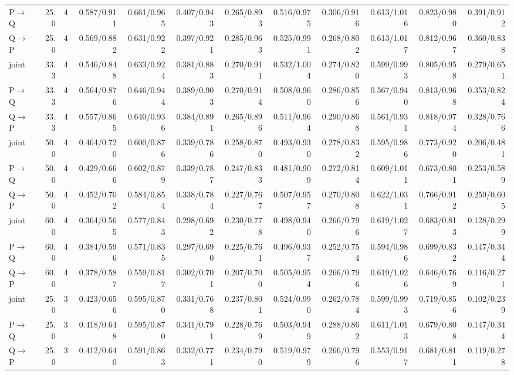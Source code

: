 \documentclass{article}
\begin{document}
\begin{longtable}{lrrrrrrrrrrr}
P$\to$Q & 25.0 & 4 & 0.587/0.911 & 0.661/0.965 & 0.407/0.943 & 0.265/0.893 & 0.516/0.975 & 0.306/0.916 & 0.613/1.016 & 0.823/0.980 & 0.391/0.912 \\
Q$\to$P & 25.0 & 4 & 0.569/0.882 & 0.631/0.922 & 0.397/0.921 & 0.285/0.963 & 0.525/0.991 & 0.268/0.802 & 0.613/1.017 & 0.812/0.967 & 0.360/0.838 \\
joint & 33.3 & 4 & 0.546/0.848 & 0.633/0.924 & 0.381/0.883 & 0.270/0.911 & 0.532/1.004 & 0.274/0.820 & 0.599/0.993 & 0.805/0.958 & 0.279/0.651 \\
P$\to$Q & 33.3 & 4 & 0.564/0.876 & 0.646/0.944 & 0.389/0.903 & 0.270/0.914 & 0.508/0.960 & 0.286/0.856 & 0.567/0.940 & 0.813/0.968 & 0.353/0.824 \\
Q$\to$P & 33.3 & 4 & 0.557/0.865 & 0.640/0.936 & 0.384/0.891 & 0.265/0.896 & 0.511/0.964 & 0.290/0.868 & 0.561/0.931 & 0.818/0.974 & 0.328/0.766 \\
joint & 50.0 & 4 & 0.464/0.720 & 0.600/0.876 & 0.339/0.786 & 0.258/0.870 & 0.493/0.930 & 0.278/0.832 & 0.595/0.986 & 0.773/0.920 & 0.206/0.481 \\
P$\to$Q & 50.0 & 4 & 0.429/0.666 & 0.602/0.879 & 0.339/0.787 & 0.247/0.833 & 0.481/0.909 & 0.272/0.814 & 0.609/1.011 & 0.673/0.801 & 0.253/0.589 \\
Q$\to$P & 50.0 & 4 & 0.452/0.702 & 0.584/0.854 & 0.338/0.784 & 0.227/0.767 & 0.507/0.957 & 0.270/0.808 & 0.622/1.031 & 0.766/0.912 & 0.259/0.605 \\
joint & 60.0 & 4 & 0.364/0.565 & 0.577/0.843 & 0.298/0.692 & 0.230/0.778 & 0.498/0.940 & 0.266/0.796 & 0.619/1.027 & 0.683/0.813 & 0.128/0.299 \\
P$\to$Q & 60.0 & 4 & 0.384/0.596 & 0.571/0.835 & 0.297/0.690 & 0.225/0.761 & 0.496/0.937 & 0.252/0.754 & 0.594/0.986 & 0.699/0.832 & 0.147/0.344 \\
Q$\to$P & 60.0 & 4 & 0.378/0.587 & 0.559/0.817 & 0.302/0.701 & 0.207/0.700 & 0.505/0.954 & 0.266/0.796 & 0.619/1.026 & 0.646/0.769 & 0.116/0.271 \\
joint & 25.0 & 3 & 0.423/0.656 & 0.595/0.870 & 0.331/0.768 & 0.237/0.801 & 0.524/0.990 & 0.262/0.784 & 0.599/0.993 & 0.719/0.856 & 0.102/0.239 \\
P$\to$Q & 25.0 & 3 & 0.418/0.648 & 0.595/0.870 & 0.341/0.791 & 0.228/0.769 & 0.503/0.949 & 0.288/0.862 & 0.611/1.013 & 0.679/0.808 & 0.147/0.344 \\
Q$\to$P & 25.0 & 3 & 0.412/0.640 & 0.591/0.863 & 0.332/0.771 & 0.234/0.790 & 0.519/0.979 & 0.266/0.796 & 0.553/0.917 & 0.681/0.811 & 0.119/0.278 \\

\end{longtable}
\end{document}
